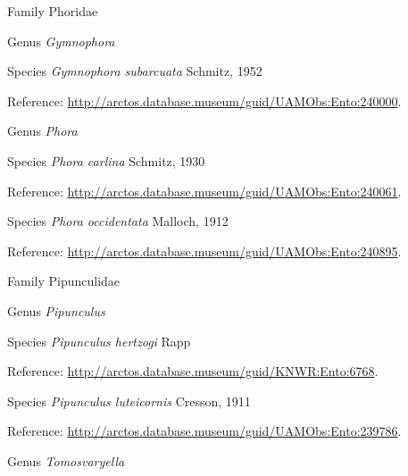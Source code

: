 \documentclass[9pt, article]{memoir}
\begin{document}
\begin{multicols}{2}
\vspace{6pt}\noindent\hspace{24pt}Family Phoridae


\vspace{6pt}\noindent\hspace{30pt}Genus \textit{Gymnophora}


\vspace{6pt}\noindent\hspace{36pt}Species \textit{Gymnophora subarcuata} Schmitz, 1952


Reference: 
\url{http://arctos.database.museum/guid/UAMObs:Ento:240000}.

\vspace{6pt}\noindent\hspace{30pt}Genus \textit{Phora}


\vspace{6pt}\noindent\hspace{36pt}Species \textit{Phora carlina} Schmitz, 1930


Reference: 
\url{http://arctos.database.museum/guid/UAMObs:Ento:240061}.

\vspace{6pt}\noindent\hspace{36pt}Species \textit{Phora occidentata} Malloch, 1912


Reference: 
\url{http://arctos.database.museum/guid/UAMObs:Ento:240895}.

\vspace{6pt}\noindent\hspace{24pt}Family Pipunculidae


\vspace{6pt}\noindent\hspace{30pt}Genus \textit{Pipunculus}


\vspace{6pt}\noindent\hspace{36pt}Species \textit{Pipunculus hertzogi} Rapp


Reference: 
\url{http://arctos.database.museum/guid/KNWR:Ento:6768}.

\vspace{6pt}\noindent\hspace{36pt}Species \textit{Pipunculus luteicornis} Cresson, 1911


Reference: 
\url{http://arctos.database.museum/guid/UAMObs:Ento:239786}.

\vspace{6pt}\noindent\hspace{30pt}Genus \textit{Tomosvaryella}



\end{multicols}
\end{document}
